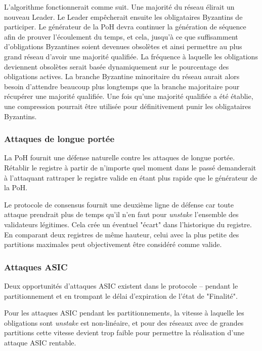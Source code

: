 \documentclass[12pt]{article}
\begin{document}
L’algorithme fonctionnerait comme suit. Une majorité du réseau élirait un nouveau Leader. Le Leader empêcherait ensuite les obligataires Byzantins de participer. Le générateur de la PoH devra continuer la génération de séquence afin de prouver l’écoulement du temps, et cela, jusqu’à ce que suffisamment d’obligations Byzantines soient devenues obsolètes et ainsi permettre au plus grand réseau d'avoir une majorité qualifiée. La fréquence à laquelle les obligations deviennent obsolètes serait basée dynamiquement sur le pourcentage des obligations actives. La branche Byzantine minoritaire du réseau aurait alors besoin d’attendre beaucoup plus longtemps que la branche majoritaire pour récupérer une majorité qualifiée. Une fois qu’une majorité qualifiée a été établie, une compression pourrait être utilisée pour définitivement punir les obligataires Byzantins.

\subsubsection{Attaques de longue portée}\label{Censure}
La PoH fournit une défense naturelle contre les attaques de longue portée. Rétablir le registre à partir de n’importe quel moment dans le passé demanderait à l’attaquant rattraper le registre valide en étant plus rapide que le générateur de la PoH.

Le protocole de consensus fournit une deuxième ligne de défense car toute attaque prendrait plus de temps qu’il n'en faut pour \textit{unstake} l'ensemble des validateurs légitimes. Cela crée un éventuel "écart" dans l’historique du registre. En comparant deux registres de même hauteur, celui avec la plus petite des partitions maximales peut objectivement être considéré comme valide.

\subsubsection{Attaques ASIC}\label{Censure}

Deux opportunités d’attaques ASIC existent dans le protocole – pendant le partitionnement et en trompant le délai d’expiration de l'état de "Finalité".

Pour les attaques ASIC pendant les partitionnements, la vitesse à laquelle les obligations sont \textit{unstake} est non-linéaire, et pour des réseaux avec de grandes partitions cette vitesse devient trop faible pour permettre la réalisation d'une attaque ASIC rentable.
\end{document}
